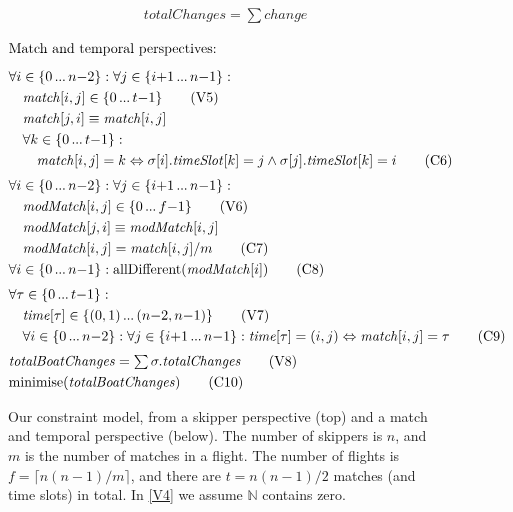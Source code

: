 \documentclass{llncs}
\newcommand{\match}{\mathit{match}}
\newcommand{\timeSlot}{\mathit{timeSlot}}
\newcommand{\change}{\mathit{change}}
\newcommand{\totalChanges}{\mathit{totalChanges}}
\newcommand{\totalBoatChanges}{\mathit{totalBoatChanges}}
\newcommand{\modMatch}{\mathit{modMatch}}
\newcommand{\timeVar}{\mathit{time}}
\newcommand{\allDifferent}{\mathrm{allDifferent}}
\newcommand{\minimise}{\mathrm{minimise}}
\newcommand\nldots{\,\hbox to 0.8em{.\hss.\hss.}\,}
\begin{document}
\begin{figure}[p]
\begin{framed}
\begin{align}
    & \totalChanges = \textstyle\sum \change \label{C5} \tag{C5}
\end{align}
\end{framed}\begin{framed}
\begin{align}
    \intertext{Match and temporal perspectives:\smallskip}
    & \forall i \in \{0 \nldots n{-}2\} : \forall j \in \{ i{+}1 \nldots n{-}1 \} : \nonumber \\
    & \hspace*{1em} \match[{i,j}] \in \{0 \nldots t{-}1\} \tag{V5} \label{V5} \\
    & \hspace*{1em} \match[{j,i}] \equiv \match[{i,j}] \nonumber \\
    & \hspace*{1em} \forall k \in \{0 \nldots t{-}1 \} : \nonumber \\
    & \hspace*{2em} \match[{i,j}] = k \Leftrightarrow \sigma[{i}].\timeSlot[{k}] = j \wedge \sigma[{j}].\timeSlot[{k}] = i \tag{C6} \label{C6} \\[0.1cm]
    & \forall i \in \{0 \nldots n{-}2\} : \forall j \in \{ i{+}1 \nldots n{-}1 \} \nonumber : \\
    & \hspace*{1em} \modMatch[{i,j}] \in \{0 \nldots f{-}1\} \label{V6} \tag{V6} \\
    & \hspace*{1em} \modMatch[{j,i}] \equiv \modMatch[{i,j}] \nonumber  \\
    & \hspace*{1em} \modMatch[{i,j}] = \match[{i,j}] / m \tag{C7} \label{C7} \\
    & \forall i \in \{0 \nldots n{-}1 \} : \allDifferent(\modMatch[{i}]) \tag{C8} \label{C8} \\[0.1cm]
    & \forall \tau \in \{0 \nldots t{-}1 \} : \nonumber \\
    & \hspace*{1em} \timeVar[{\tau}] \in \{(0,1) \nldots (n{-}2,n{-}1)\} \tag{V7} \label{V7} \\
    & \hspace*{1em} \forall i \in \{0 \nldots n{-}2\} : \forall  j \in \{ i{+}1 \nldots n{-}1 \} : \timeVar[{\tau}] = (i,j) \Leftrightarrow \match[{i,j}] = \tau \tag{C9} \label{C9} \\[0.1cm]
    & \totalBoatChanges = \textstyle\sum \sigma.\totalChanges \label{V8} \tag{V8} \\
    & \minimise(\totalBoatChanges) \label{C10} \tag{C10}
\end{align}
\end{framed}
\caption{Our constraint model, from a skipper perspective (top) and a match and temporal perspective
(below). The number of skippers is $n$, and $m$ is the number of matches in a flight. The number of
flights is $f = \lceil n(n-1)/m \rceil$, and there are $t = n(n-1)/2$ matches (and time slots) in
total. In \eqref{V4} we assume $\mathbb{N}$ contains zero.}\label{model:stage1}
\end{figure}
\end{document}
